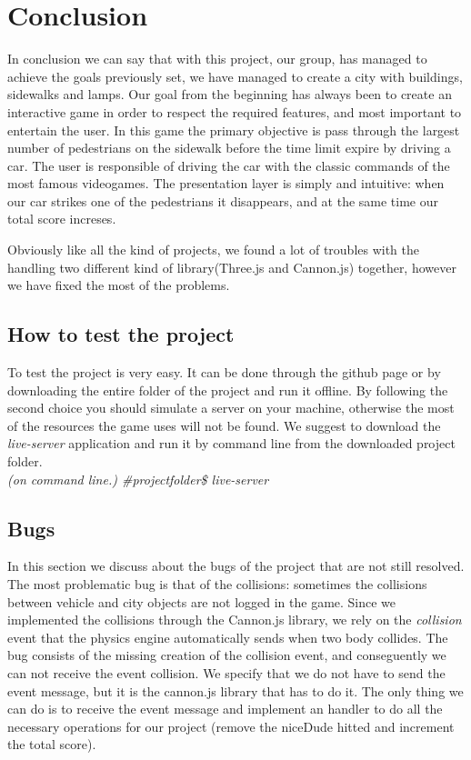 \documentclass[a4paper, 11pt, titlepage]{report}
\begin{document}
\chapter{Conclusion}
	\par In conclusion we can say that with this project, our group, has managed to achieve the goals previously set, we have managed to create a city with buildings, sidewalks and lamps. Our goal from the beginning has always been to create an interactive game in order to respect the required features, and most important to entertain the user.
	In this game the primary objective is pass through the largest number of pedestrians on the sidewalk before the time limit expire by driving a car. The user is responsible of driving the car with the classic commands of the most famous videogames. The presentation layer is simply and intuitive: when our car strikes one of the pedestrians it disappears, and at the same time our total score increses. \\
	\par Obviously like all the kind of projects, we found a lot of troubles with the handling two different kind of library(Three.js and Cannon.js) together, however we have fixed the most of the problems.  
	
	\section{How to test the project}
	    \par To test the project is very easy. It can be done through the github page or by downloading the entire folder of the project and run it offline. By following the second choice you should simulate a server on your machine, otherwise the most of the resources the game uses will not be found. We suggest to download the \emph{live-server} \cite{liveserver} application and run it by command line from the downloaded project folder. \\
	    \emph{(on command line.) \#\/projectfolder\/\$ live-server}
	\section{Bugs}
    	\par In this section we discuss about the bugs of the project that are not still resolved.
    	The most problematic bug is that of the collisions: sometimes the collisions between vehicle and city objects are not logged in the game. Since we implemented the collisions through the Cannon.js library, we rely on the \emph{collision} event that the physics engine automatically sends when two body collides. The bug consists of the missing creation of the collision event, and conseguently we can not receive the event collision. We specify that we do not have to send the event message, but it is the cannon.js library that has to do it. The only thing we can do is to receive the event message and implement an handler to do all the necessary operations for our project (remove the niceDude hitted and increment the total score).
\end{document}
